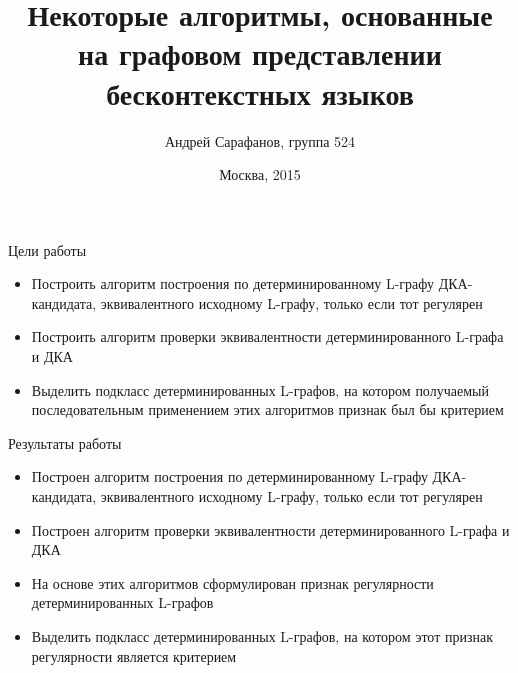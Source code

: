 \documentclass{beamer}
\title {Некоторые алгоритмы, основанные на графовом представлении бесконтекстных языков}
\author {Андрей Сарафанов, группа 524}
\institute {\small{
  Факультет вычислительной математики и кибернетики\\
  МГУ им. Ломоносова
}}
\date {\footnotesize{Москва, 2015}}
\begin{document}
\begin{frame}
  \titlepage
\end{frame}

\begin{frame} {Цели работы}
\begin{itemize}
  \item Построить алгоритм построения по детерминированному L-графу ДКА-кандидата, эквивалентного исходному L-графу, только если тот регулярен
  \item Построить алгоритм проверки эквивалентности детерминированного L-графа и ДКА
  \item Выделить подкласс детерминированных L-графов, на котором получаемый последовательным применением этих алгоритмов признак был бы критерием
\end{itemize}
\end{frame}

\begin{frame} {Результаты работы}
\begin{itemize}
  \item Построен алгоритм построения по детерминированному L-графу ДКА-кандидата, эквивалентного исходному L-графу, только если тот регулярен
  \item Построен алгоритм проверки эквивалентности детерминированного L-графа и ДКА
  \item На основе этих алгоритмов сформулирован признак регулярности детерминированных L-графов
  \item Выделить подкласс детерминированных L-графов, на котором этот признак регулярности является критерием
\end{itemize}
\end{frame}
\end{document}
